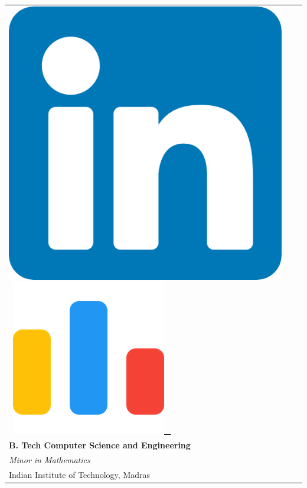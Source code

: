 \documentclass[10pt,article]{article}
\begin{document}
\begin{table}
\begin{minipage}{0.9\linewidth}
\begin{tabular}{l l r}
{{ \href{https://www.linkedin.com/in/snehadeep-gayen/}{\includegraphics[scale=0.05]{linkedin.png}} \ \href{https://codeforces.com/profile/Snehadeep}{\includegraphics[scale=0.06]{cf.png} \ } 
            }}
            \\
            \textbf{B. Tech Computer Science and Engineering}
            \\
            {\textit{Minor in Mathematics}} 
            \\
            {Indian Institute of Technology, Madras} 
            \\
        \end{tabular}
    \end{minipage}\hfill
\end{table}
\end{document}
